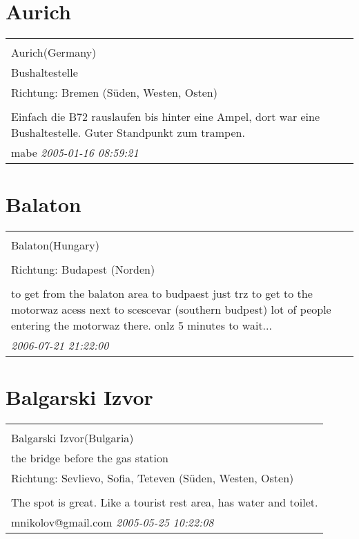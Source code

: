 \documentclass[a4paper,12pt]{article}
\begin{document}
\section{Aurich}
\begin{tabular}{|p{13cm}|}
\hline\\
Aurich(Germany)\\
Bushaltestelle\\
Richtung: Bremen (Süden, Westen, Osten) \\
\hline\\
Einfach die B72 rauslaufen bis hinter eine Ampel, dort war eine Bushaltestelle. Guter Standpunkt zum trampen. \\
mabe \textit{ 2005-01-16 08:59:21 }\\\hline
\end{tabular}


\section{Balaton}
\begin{tabular}{|p{13cm}|}
\hline\\
Balaton(Hungary)\\
\\
Richtung: Budapest (Norden) \\
\hline\\
to get from the balaton area to budpaest just trz to get to the motorwaz acess next to scescevar (southern budpest) lot of people entering the motorwaz there. onlz 5 minutes to wait... \\
\textit{ 2006-07-21 21:22:00 }\\\hline
\end{tabular}


\section{Balgarski Izvor}
\begin{tabular}{|p{13cm}|}
\hline\\
Balgarski Izvor(Bulgaria)\\
the bridge before the gas station\\
Richtung: Sevlievo, Sofia, Teteven (Süden, Westen, Osten) \\
\hline\\
The spot is great. Like a tourist rest area, has water and toilet. \\
mnikolov@gmail.com \textit{ 2005-05-25 10:22:08 }\\\hline
\end{tabular}
\end{document}
